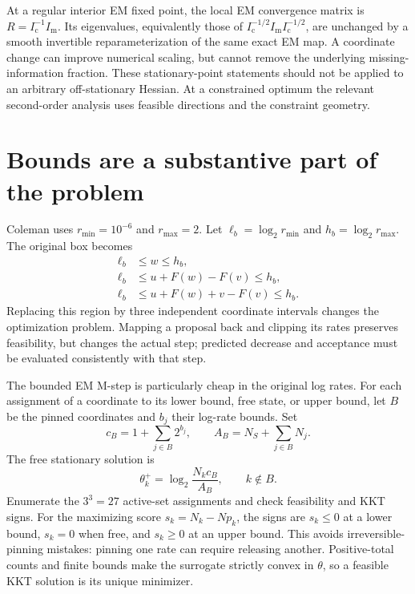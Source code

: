 \documentclass[11pt]{article}
\newcommand{\Ic}{I_{\mathrm c}}
\newcommand{\Imis}{I_{\mathrm m}}
\begin{document}
At a regular interior EM fixed point, the local EM convergence matrix is
$R=\Ic^{-1}\Imis$. Its eigenvalues, equivalently those of
$\Ic^{-1/2}\Imis\Ic^{-1/2}$, are unchanged by a smooth invertible
reparameterization of the same exact EM map. A coordinate change can improve
numerical scaling, but cannot remove the underlying missing-information
fraction. These stationary-point statements should not be applied to an
arbitrary off-stationary Hessian. At a constrained optimum the relevant
second-order analysis uses feasible directions and the constraint geometry.

\section{Bounds are a substantive part of the problem}

Coleman uses $r_{\min}=10^{-6}$ and $r_{\max}=2$. Let
$\ell_b=\log_2 r_{\min}$ and $h_b=\log_2 r_{\max}$. The original box becomes
\begin{align}
 \ell_b&\leq w\leq h_b,\\
 \ell_b&\leq u+F(w)-F(v)\leq h_b,\\
 \ell_b&\leq u+F(w)+v-F(v)\leq h_b.
 \label{eq:coupled-bounds}
\end{align}
Replacing this region by three independent coordinate intervals changes the
optimization problem. Mapping a proposal back and clipping its rates preserves
feasibility, but changes the actual step; predicted decrease and acceptance
must be evaluated consistently with that step.

The bounded EM M-step is particularly cheap in the original log rates. For each
assignment of a coordinate to its lower bound, free state, or upper bound,
let $B$ be the pinned coordinates and $b_j$ their log-rate bounds. Set
\[
 c_B=1+\sum_{j\in B}2^{b_j},\qquad
 A_B=N_S+\sum_{j\in B}N_j.
\]
The free stationary solution is
\begin{equation}
 \theta_k^+=\log_2\frac{N_kc_B}{A_B},\qquad k\notin B.
 \label{eq:bounded-em}
\end{equation}
Enumerate the $3^3=27$ active-set assignments and check feasibility and KKT signs.
For the maximizing score $s_k=N_k-Np_k$, the signs are $s_k\leq0$ at a
lower bound, $s_k=0$ when free, and $s_k\geq0$ at an upper bound. This avoids
irreversible-pinning mistakes: pinning one rate can require releasing another.
Positive-total counts and finite bounds make the surrogate strictly convex
in $\theta$, so a feasible KKT solution is its unique minimizer.
\end{document}
